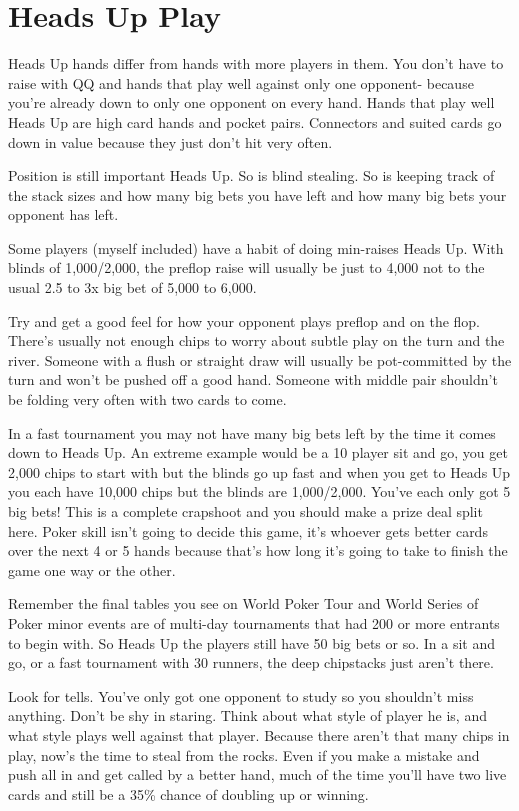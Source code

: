 \section{Heads Up Play}

Heads Up hands differ from hands with more players in them.
You don't have to raise with QQ and hands that play well
against only one opponent- because you're already down
to only one opponent on every hand. Hands that play
well Heads Up are high card hands and pocket pairs.
Connectors and suited cards go down in value because
they just don't hit very often.

Position is still important Heads Up. So is blind stealing.
So is keeping track of the stack sizes and how many big bets
you have left and how many big bets your opponent has left.

Some players (myself included) have a habit of doing min-raises
Heads Up. With blinds of 1,000/2,000, the preflop raise will usually
be just to 4,000 not to the usual 2.5 to 3x big bet of 5,000 to 6,000.

Try and get a good feel for how your opponent plays
preflop and on the flop. There's usually not enough
chips to worry about subtle play on the turn and the river.
Someone with a flush or straight draw will usually be
pot-committed by the turn and won't be pushed off a
good hand. Someone with middle pair shouldn't be folding
very often with two cards to come.

In a fast tournament you may not have many big bets left by
the time it comes down to Heads Up. An extreme example would
be a 10 player sit and go, you get 2,000 chips to start with
but the blinds go up fast and when you get to Heads Up
you each have 10,000 chips but the blinds are 1,000/2,000.
You've each only got 5 big bets! This is a complete
crapshoot and you should make a prize deal split here. Poker skill
isn't going to decide this game, it's whoever gets better
cards over the next 4 or 5 hands because that's how long
it's going to take to finish the game one way or the other.

Remember the final tables you see on World Poker Tour and
World Series of Poker minor events are of multi-day tournaments that had
200 or more entrants to begin with. So Heads Up the players
still have 50 big bets or so. In a sit and go, or
a fast tournament with 30 runners, the deep chipstacks
just aren't there.

Look for tells. You've only got one opponent to study so
you shouldn't miss anything. Don't be shy in staring.
Think about what style of player he is, and what style
plays well against that player. Because there aren't
that many chips in play, now's the time to steal from
the rocks. Even if you make a mistake and push all in
and get called by a better hand, much of the time you'll
have two live cards and still be a 35\% chance of doubling
up or winning.

